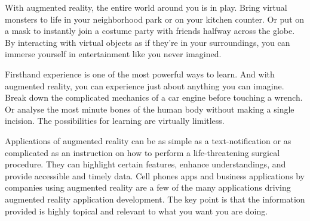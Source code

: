 \documentclass[BTech]{srmuthesis}
\begin{document}
With augmented reality, the entire world around you is in play. Bring virtual monsters to life in your neighborhood park or on your kitchen counter. Or put on a mask to instantly join a costume party with friends halfway across the globe. By interacting with virtual objects as if they're in your surroundings, you can immerse yourself in entertainment like you never imagined.

Firsthand experience is one of the most powerful ways to learn. And with augmented reality, you can experience just about anything you can imagine. Break down the complicated mechanics of a car engine before touching a wrench. Or analyse the most minute bones of the human body without making a single incision. The possibilities for learning are virtually limitless.

Applications of augmented reality can be as simple as a text-notification or as complicated as an instruction on how to perform a life-threatening surgical procedure. They can highlight certain features, enhance understandings, and provide accessible and timely data. Cell phones apps and business applications by companies using augmented reality are a few of the many applications driving augmented reality application development. The key point is that the information provided is highly topical and relevant to what you want you are doing.
\end{document}

